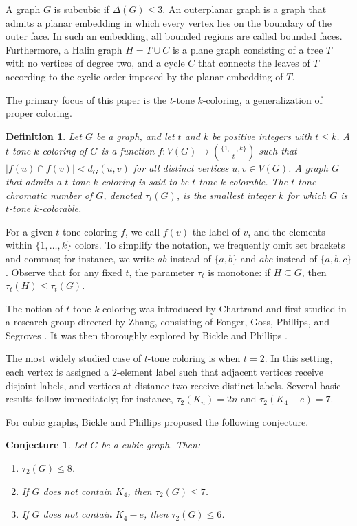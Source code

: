 \documentclass[12pt]{article}
\numberwithin{theorem}{section}
\newtheorem{conjecture}{Conjecture}
\numberwithin{conjecture}{section}
\numberwithin{corollary}{section}
\numberwithin{example}{section}
\numberwithin{lemma}{section}
\numberwithin{proposition}{section}
\numberwithin{problem}{section}
\numberwithin{remark}{section}
\numberwithin{claim}{theorem}
\newtheorem{definition}{Definition}
\numberwithin{definition}{section}
\begin{document}
\noindent A graph $G$ is subcubic if $\Delta(G) \le 3$. An outerplanar graph is a graph that admits a planar embedding in which every vertex lies on the boundary of the outer face. In such an embedding, all bounded regions are called bounded faces. Furthermore, a Halin graph $H = T \cup C$ is a plane graph consisting of a tree $T$ with no vertices of degree two, and a cycle $C$ that connects the leaves of $T$ according to the cyclic order imposed by the planar embedding of $T$.

\noindent The primary focus of this paper is the $t$-tone $k$-coloring, a generalization of proper coloring. 
\begin{definition}
Let $G$ be a graph, and let $t$ and $k$ be positive integers with $t\le k$. A \emph{$t$-tone $k$-coloring} of $G$ is a function $f \colon V(G) \to \binom{\{1, \dots, k\}}{t}$ such that $|f(u) \cap f(v)| < d_G(u,v)$ for all distinct vertices $u,v \in V(G)$.  A graph $G$ that admits a $t$-tone $k$-coloring is said to be \emph{$t$-tone $k$-colorable}. The \emph{$t$-tone chromatic number} of $G$, denoted $\tau_t(G)$, is the smallest integer $k$ for which $G$ is $t$-tone $k$-colorable.
\end{definition}
\noindent For a given $t$-tone coloring $f$, we call $f(v)$ the label of $v$, and the elements within $\{1, \dots, k\}$ colors. To simplify the notation, we frequently omit set brackets and commas; for instance, we write $ab$ instead of $\{a, b\}$ and $abc$ instead of $\{a, b, c\}$. Observe that for any fixed $t$, the parameter $\tau_t$ is monotone: if $H \subseteq G$, then $\tau_t(H) \le \tau_t(G)$.

\noindent The notion of $t$-tone $k$-coloring was introduced by Chartrand and first studied in a research group directed by Zhang, consisting of Fonger, Goss, Phillips, and Segroves \cite{F}. It was then thoroughly explored by Bickle and Phillips \cite{BP}.

\noindent The most widely studied case of $t$-tone coloring is when $t=2$. In this setting, each vertex is assigned a $2$-element label such that adjacent vertices receive disjoint labels, and vertices at distance two receive distinct labels. Several basic results follow immediately; for instance, $\tau_2(K_n)=2n$ and $\tau_2(K_4-e)=7$.  

\noindent For cubic graphs, Bickle and Phillips \cite{BP} proposed the following conjecture.

\begin{conjecture}\label{conj}
Let $G$ be a cubic graph. Then:
\begin{enumerate}
    \item $\tau_2(G)\le 8$.
    \item If $G$ does not contain $K_4$, then $\tau_2(G)\le 7$.
    \item If $G$ does not contain $K_4-e$, then $\tau_2(G)\le 6$.
\end{enumerate}
\end{conjecture}
\end{document}
